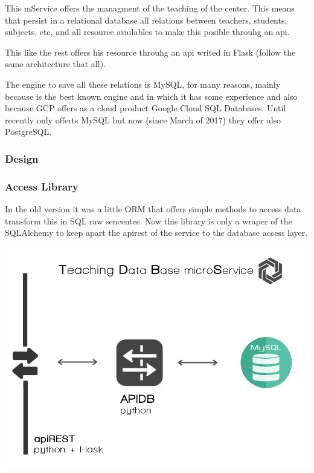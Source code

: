 This mService offers the managment of the teaching of the center.
This means that persist in a relational database all relations between
teachers, students, subjects, etc, and all resource availables to
make this posible throuhg an api.\bigskip

This like the rest offers his resource throuhg an api writed in Flask
(follow the same architecture that all).

The engine to save all these relations is MySQL, for many reasons,
mainly because is the best known engine and in which it has some experience
and also because GCP offers as a cloud product Google Cloud SQL Databases.
Until recently only offerts MySQL but now (since March of 2017) they
offer also PostgreSQL.

\subsubsection{Design}






\subsubsection{Access Library}

In the old version it was a little ORM that offers simple methods
to access data transform this in SQL raw sencentes. Now this library
is only a wraper of the SQLAlchemy to keep apart the apirest of the
service to the database access layer.

\begin{center}
\includegraphics[scale=0.35]{img/graphics/tdbms.png}
\end{center}

